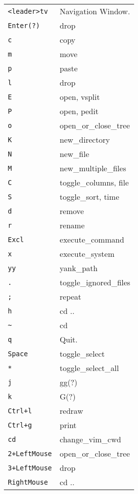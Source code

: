 \begin{multicols}{3}
\section{}
\begin{tabular}{@{}ll@{}}
	\verb!<leader>tv! & Navigation Window. \\
    \verb!Enter(?)! & drop \\
	\verb!c! & copy \\
	\verb!m! & move \\
	\verb!p! & paste \\
	\verb!l! & drop \\
	\verb!E! & open, vsplit \\
	\verb!P! & open, pedit \\
	\verb!o! & open\_or\_close\_tree \\
	\verb!K! & new\_directory \\
	\verb!N! & new\_file \\
	\verb!M! & new\_multiple\_files \\
    \verb!C! & toggle\_columns, file \\
    \verb!S! & toggle\_sort, time \\
	\verb!d! & remove \\
	\verb!r! & rename \\
    \verb!Excl! &  execute\_command \\
	\verb!x! & execute\_system \\
	\verb!yy! & yank\_path \\
	\verb!.! & toggle\_ignored\_files \\
	\verb!;! & repeat \\
	\verb!h! & cd .. \\
	\verb!~! & cd \\
	\verb!q! & Quit. \\
	\verb!Space! & toggle\_select \\
	\verb!*! & toggle\_select\_all \\
    \verb!j! & gg(?) \\
    \verb!k! & G(?) \\
	\verb!Ctrl+l! & redraw \\
	\verb!Ctrl+g! & print \\
	\verb!cd! & change\_vim\_cwd \\
	\verb!2+LeftMouse! & open\_or\_close\_tree \\
	\verb!3+LeftMouse! & drop \\
	\verb!RightMouse! & cd .. \\
\end{tabular}


\end{multicols}
